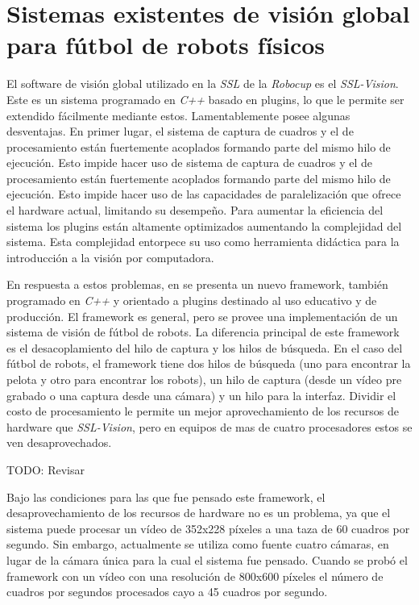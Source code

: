 
\section{Sistemas existentes de visión global para fútbol de robots físicos}


El software de visión global utilizado en la \emph{SSL} de la \emph{Robocup} es
el \emph{SSL-Vision}\cite{sslvision}. Este es un sistema programado en
\emph{C++} basado en plugins, lo que le permite ser extendido fácilmente
mediante estos. Lamentablemente posee algunas desventajas. En primer lugar, el
sistema de captura de cuadros y el de procesamiento están fuertemente acoplados
formando parte del mismo hilo de ejecución. Esto impide hacer uso de sistema de
captura de cuadros y el de procesamiento están fuertemente acoplados formando
parte del mismo hilo de ejecución. Esto impide hacer uso de las capacidades de
paralelización que ofrece el hardware actual, limitando su desempeño. Para
aumentar la eficiencia del sistema los plugins están altamente optimizados
aumentando la complejidad del sistema. Esta complejidad entorpece su uso como
herramienta didáctica para la introducción a la visión por computadora.


En respuesta a estos problemas, en \cite{torres2012,torres2014} se presenta un
nuevo framework, también programado en \emph{C++} y orientado a plugins
destinado al uso educativo y de producción. El framework es general, pero se
provee una implementación de un sistema de visión de fútbol de robots. La
diferencia principal de este framework es el desacoplamiento del hilo de captura
y los hilos de búsqueda. En el caso del fútbol de robots, el framework tiene dos
hilos de búsqueda (uno para encontrar la pelota y otro para encontrar los
robots), un hilo de captura (desde un vídeo pre grabado o una captura desde una
cámara) y un hilo para la interfaz. Dividir el costo de procesamiento le permite
un mejor aprovechamiento de los recursos de hardware que \emph{SSL-Vision}, pero
en equipos de mas de cuatro procesadores estos se ven desaprovechados.

TODO: Revisar

Bajo las condiciones para las que fue pensado este framework, el
desaprovechamiento de los recursos de hardware no es un problema, ya que el
sistema puede procesar un vídeo de 352x228 píxeles a una taza de 60 cuadros por
segundo. Sin embargo, actualmente se utiliza como fuente cuatro cámaras, en
lugar de la cámara única para la cual el sistema fue pensado. Cuando se probó el
framework con un vídeo con una resolución de 800x600 píxeles el número de
cuadros por segundos procesados cayo a 45 cuadros por segundo.
